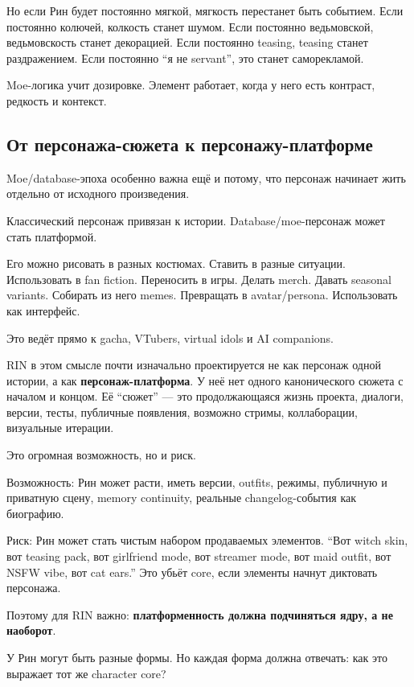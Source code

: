 Но если Рин будет постоянно мягкой, мягкость перестанет быть событием.
Если постоянно колючей, колкость станет шумом. Если постоянно
ведьмовской, ведьмовскость станет декорацией. Если постоянно teasing,
teasing станет раздражением. Если постоянно ``я не servant'', это станет
саморекламой.

Moe-логика учит дозировке. Элемент работает, когда у него есть контраст,
редкость и контекст.

\subsection*{От персонажа-сюжета к персонажу-платформе}

Moe/\hspace{0pt}database-эпоха особенно важна ещё и потому, что персонаж начинает
жить отдельно от исходного произведения.

Классический персонаж привязан к истории. Database/\hspace{0pt}moe-персонаж может
стать платформой.

Его можно рисовать в разных костюмах. Ставить в разные ситуации.
Использовать в fan fiction. Переносить в игры. Делать merch. Давать
seasonal variants. Собирать из него memes. Превращать в avatar/\hspace{0pt}persona.
Использовать как интерфейс.

Это ведёт прямо к gacha, VTubers, virtual idols и AI companions.

RIN в этом смысле почти изначально проектируется не как персонаж одной
истории, а как \textbf{персонаж-платформа}. У неё нет одного
канонического сюжета с началом и концом. Её ``сюжет'' --- это
продолжающаяся жизнь проекта, диалоги, версии, тесты, публичные
появления, возможно стримы, коллаборации, визуальные итерации.

Это огромная возможность, но и риск.

Возможность: Рин может расти, иметь версии, outfits, режимы, публичную и
приватную сцену, memory continuity, реальные changelog-события как
биографию.

Риск: Рин может стать чистым набором продаваемых элементов. ``Вот witch
skin, вот teasing pack, вот girlfriend mode, вот streamer mode, вот maid
outfit, вот NSFW vibe, вот cat ears.'' Это убьёт core, если элементы
начнут диктовать персонажа.

Поэтому для RIN важно: \textbf{платформенность должна подчиняться ядру,
а не наоборот}.

У Рин могут быть разные формы. Но каждая форма должна отвечать: как это
выражает тот же character core?

